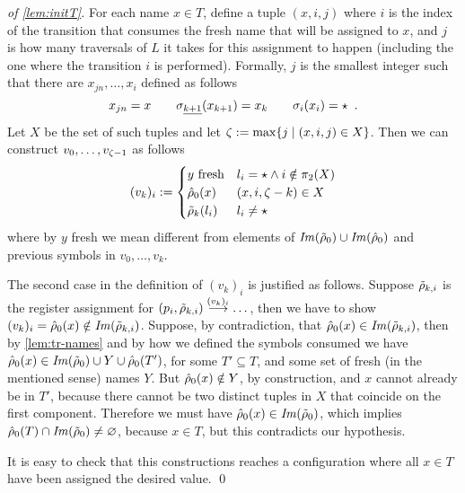 \begin{proof}[of \cref{lem:initT}]
For each name $x \in T$, define a tuple $(x,i,j)$ where $i$ is the index of the transition that consumes the fresh name that will be assigned to $x$, and $j$ is how many traversals of $L$ it takes for this assignment to happen (including the one where the transition $i$ is performed). Formally, $j$ is the smallest integer such that there are $x_{jn},\dots,x_i$ defined as follows
\[
	x_{jn} = x \qquad \sigma_{\underline{k+1}}(x_{k+1}) = x_k \qquad \sigma_i(x_i) = \star \enspace .
\]
Let $X$ be the set of such tuples and let $\zeta := \max \{ j \mid (x,i,j) \in X \}$. Then we can construct $v_0,\dots,v_{\zeta-1}$ as follows
\[
	(v_k)_i :=
	\begin{cases}
		\text{$y$ fresh} & l_i = \star \land i \notin \pi_2(X) \\
		\hat{\rho}_0(x) & (x,i,\zeta - k) \in X
		 \\
		\tilde{\rho}_{k}(l_i) & l_i \neq \star
	\end{cases}
\]
%
where by $y$ fresh we mean different from elements of $\mathit{Im}(\tilde{\rho}_0) \cup \mathit{Im}(\hat{\rho}_0)$ and previous symbols in $v_0,\dots,v_{k}$.

The second case in the definition of $(v_k)_i$ is justified as follows. Suppose $\tilde{\rho}_{k,i}$ is the register assignment for $(p_i,\tilde{\rho}_{k,i}) \overset{(v_k)_i}{\longrightarrow} \dots$, then we have to show $(v_k)_i = \hat{\rho}_0(x) \notin \mathit{Im}(\tilde{\rho}_{k,i})$. Suppose, by contradiction, that $\hat{\rho}_0(x) \in \mathit{Im}(\tilde{\rho}_{k,i})$, then by \cref{lem:tr-names} and by how we defined the symbols consumed we have $\hat{\rho}_0(x) \in \mathit{Im}(\tilde{\rho}_0) \cup Y \cup \hat{\rho}_0(T')$, for some $T' \subseteq T$, and some set of fresh (in the mentioned sense) names $Y$.
But $\hat{\rho}_0(x) \notin Y$, by construction, and $x$ cannot already be in $T'$, because there cannot be two distinct tuples in $X$ that coincide on the first component. Therefore we must have
$\hat{\rho}_0(x) \in \mathit{Im}(\tilde{\rho}_0)$, which implies $\hat{\rho}_0(T) \cap \mathit{Im}(\tilde{\rho}_0) \neq \varnothing$, because $x \in T$, but this contradicts our hypothesis.

It is easy to check that this constructions reaches a configuration where all $x \in T$ have been assigned the desired value. 
\qed
\end{proof}